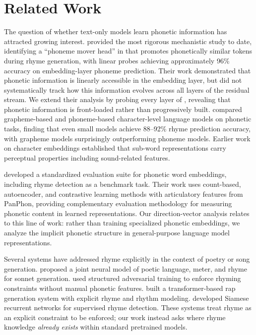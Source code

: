 \section{Related Work}
\label{sec:related}

The question of whether text-only models learn phonetic information has attracted growing interest.
\citet{mclaughlin2025rhyme} provided the most rigorous mechanistic study to date, identifying a ``phoneme mover head'' in \llama that promotes phonetically similar tokens during rhyme generation, with linear probes achieving approximately 96\% accuracy on embedding-layer phoneme prediction.
Their work demonstrated that phonetic information is linearly accessible in the embedding layer, but did not systematically track how this information evolves across all layers of the residual stream.
We extend their analysis by probing every layer of \gptmed, revealing that phonetic information is front-loaded rather than progressively built.
\citet{bunzeck2024small} compared grapheme-based and phoneme-based character-level language models on phonetic tasks, finding that even small models achieve 88--92\% rhyme prediction accuracy, with grapheme models surprisingly outperforming phoneme models.
Earlier work on character embeddings \citep{elhage2022interpreting} established that sub-word representations carry perceptual properties including sound-related features.

\citet{zouhar2023pwesuite} developed a standardized evaluation suite for phonetic word embeddings, including rhyme detection as a benchmark task.
Their work uses count-based, autoencoder, and contrastive learning methods with articulatory features from PanPhon, providing complementary evaluation methodology for measuring phonetic content in learned representations.
Our direction-vector analysis relates to this line of work: rather than training specialized phonetic embeddings, we analyze the implicit phonetic structure in general-purpose language model representations.

Several systems have addressed rhyme explicitly in the context of poetry or song generation.
\citet{lau2018deep} proposed a joint neural model of poetic language, meter, and rhyme for sonnet generation.
\citet{jhamtani2019learning} used structured adversarial training to enforce rhyming constraints without manual phonetic features.
\citet{xue2021deeprapper} built a transformer-based rap generation system with explicit rhyme and rhythm modeling.
\citet{haider2018supervised} developed Siamese recurrent networks for supervised rhyme detection.
These systems treat rhyme as an explicit constraint to be enforced; our work instead asks where rhyme knowledge \emph{already exists} within standard pretrained models.

